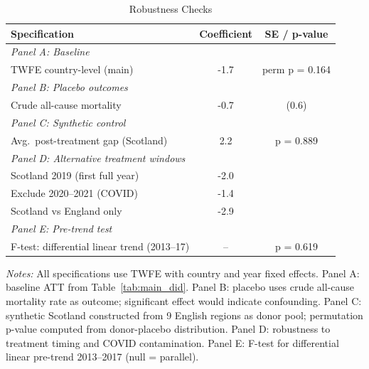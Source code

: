 \begin{table}[htbp]
\centering
\caption{Robustness Checks}
\label{tab:robustness}
\small
\begin{tabular}{lcc}
\toprule
Specification & Coefficient & SE / p-value \\
\midrule
\textit{Panel A: Baseline} & & \\
\quad TWFE country-level (main) & -1.7 & perm p = 0.164 \\
\midrule
\textit{Panel B: Placebo outcomes} & & \\
\quad Crude all-cause mortality & -0.7 & (0.6) \\
\midrule
\textit{Panel C: Synthetic control} & & \\
\quad Avg.~post-treatment gap (Scotland) & 2.2 & p = 0.889 \\
\midrule
\textit{Panel D: Alternative treatment windows} & & \\
\quad Scotland 2019 (first full year) & -2.0 & \\
\quad Exclude 2020--2021 (COVID) & -1.4 & \\
\quad Scotland vs England only & -2.9 & \\
\midrule
\textit{Panel E: Pre-trend test} & & \\
\quad F-test: differential linear trend (2013--17) & -- & p = 0.619 \\
\bottomrule
\end{tabular}
\begin{tablenotes}
\small
\item \textit{Notes:} All specifications use TWFE with country and year fixed effects. 
Panel A: baseline ATT from Table~\ref{tab:main_did}. 
Panel B: placebo uses crude all-cause mortality rate as outcome; 
significant effect would indicate confounding. 
Panel C: synthetic Scotland constructed from 9 English regions as donor pool; 
permutation p-value computed from donor-placebo distribution. 
Panel D: robustness to treatment timing and COVID contamination. 
Panel E: F-test for differential linear pre-trend 2013--2017 (null = parallel).
\end{tablenotes}
\end{table}
